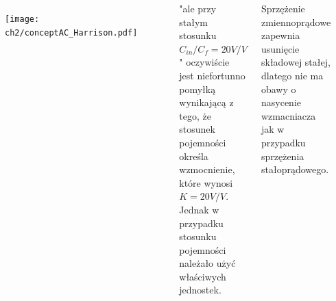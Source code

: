 \begin{frame}[t]
    \vspace{-1em}
    \begin{block}{\dk}
    \end{block}

    \begin{block}{\dk}
    \end{block}

    \begin{columns}

        \begin{figure}[H]
            \texttt{[image: ch2/conceptAC\_Harrison.pdf]} 
        \end{figure}
    
        "ale przy stałym stosunku $C_{in}/C_{f} = 20 V/V$" oczywiście jest niefortunno pomyłką wynikającą z tego, że stosunek pojemności określa wzmocnienie, które wynosi $K = 20 V/V$. Jednak w przypadku stosunku pojemności należało użyć właściwych jednostek.

        Sprzężenie zmiennoprądowe zapewnia usunięcie składowej stałej, dlatego nie ma obawy o nasycenie wzmacniacza jak w przypadku sprzężenia stałoprądowego.


    \end{columns}

\end{frame}

